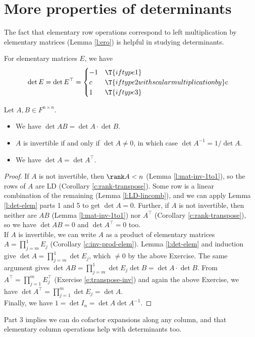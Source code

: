 \section{More properties of determinants}
The fact that elementary row operations correspond to left multiplication by elementary matrices (Lemma \ref{l:ero}) is helpful in studying determinants.
\begin{exer}
For elementary matrices $E$, we have
\[ \det E= \det E^\top = \begin{cases}-1 & \T{if type 1}\\
c & \T{if type 2 with scalar multiplication by }$c$\\
1 & \T{if type 3}
\end{cases}\]
\end{exer}
\begin{lem}\label{l:det-mult}
Let $A,B \in F^{n \times n}$.
\begin{itemize}
\item We have $\det AB= \det A \cdot \det B$.
\item $A$ is invertible if and only if $\det A \neq 0$, in which case $\det A^{-1}=1/ \det A$.
\item We have $\det A= \det A^\top$.
\end{itemize}
\end{lem}
\begin{proof}
If $A$ is not invertible, then $\rank A<n$ (Lemma \ref{l:mat-inv-1to1}), so the rows of $A$ are LD (Corollary \ref{c:rank-transpose}). Some row is a linear combination of the remaining (Lemma \ref{l:LD-lincomb}), and we can apply Lemma \ref{l:det-elem} parts 1 and 5  to get $\det A=0$.
Further, if $A$ is not invertible, then neither are $AB$ (Lemma \ref{l:mat-inv-1to1}) nor $A^\top$ (Corollary \ref{c:rank-transpose}), so we have $\det AB=0$ and $\det A^\top =0$ too.\\
If $A$ is invertible, we can write $A$ as a product of elementary matrices $A= \prod_{j=m}^1E_j$ (Corollary \ref{c:inv-prod-elem}). Lemma \ref{l:det-elem} and induction give $\det A= \prod_{j=m}^1 \det E_j$, which $\neq 0$ by the above Exercise. The same argument gives $\det AB= \prod_{j=m}^1 \det E_j \det B= \det A \cdot \det B$. From $A^\top = \prod_{j=1}^mE_j^\top$ (Exercise \ref{e:transpose-inv}) and again the above Exercise, we have $\det A^\top= \prod_{j=1}^m \det E_j= \det A$.\\
Finally, we have $1= \det I_n= \det A \det A^{-1}$.
\end{proof}
Part 3 implies we can do cofactor expansions along any column, and that elementary column operations help with determinants too.
